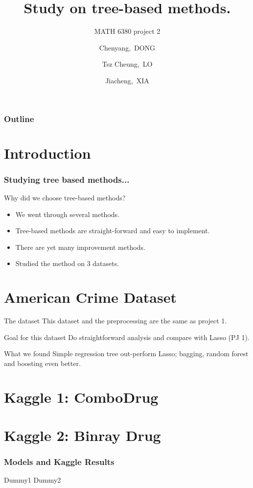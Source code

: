 \documentclass{beamer}
\title[MATH 6380 Project 2]{Study on tree-based methods.}
\subtitle{MATH 6380 project 2}
\author[C.Dong, T.C.LO, J.Xia]
{Chenyang,~DONG \and Tsz Cheung,~LO \and Jiacheng,~XIA}
\begin{document}
\frame{\titlepage}

\begin{frame}
\frametitle{Outline}
\tableofcontents
\end{frame}

\section{Introduction}
\begin{frame}
\frametitle{Studying tree based methods...}
Why did we choose tree-based methods?
\pause
\begin{itemize}
\item We went through several methods.
\pause
\item Tree-based methods are straight-forward and easy to implement.
\pause
\item There are yet many improvement methods.
\pause
\item Studied the method on 3 datasets.
\end{itemize}
\end{frame}

\section{American Crime Dataset}
\begin{frame}
\begin{block}{The dataset}
This dataset and the preprocessing are the same as project 1.
\end{block}
\pause
\begin{exampleblock}{Goal for this dataset}
Do straightforward analysis and compare with Lasso (PJ 1).
\end{exampleblock}
\begin{alertblock}{What we found}
Simple regression tree out-perform Lasso; bagging, random forest and boosting even better.
\end{alertblock}
\end{frame}

\section{Kaggle 1:  ComboDrug}


\section{Kaggle 2: Binray Drug}
\begin{frame}
\frametitle{Models and Kaggle Results}
Dummy1
\pause
Dummy2
\end{frame}
\end{document}
